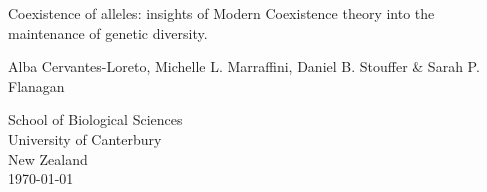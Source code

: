 \documentclass[../main.tex]{subfiles}
\begin{document}
\begin{titlepage}
    \begin{center}
        \vspace*{2cm}
        \Huge
        Coexistence of alleles: insights of Modern Coexistence theory into the maintenance of genetic diversity.

        \vspace{2.5cm}
        \LARGE
       Alba Cervantes-Loreto, Michelle L. Marraffini, Daniel B. Stouffer \& Sarah P. Flanagan

        \vspace{3cm}
        \Large
        School of Biological Sciences\\
        University of Canterbury\\
        New Zealand\\

        \vspace{3cm}
        \today
    \end{center}
\end{titlepage}
\end{document}
